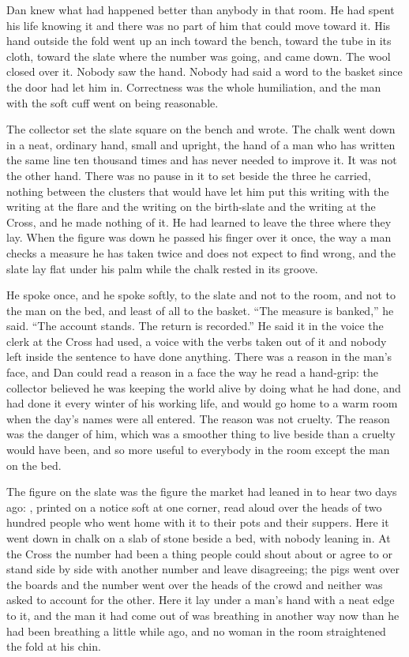 Dan knew what had happened better than anybody in that room. He had spent his life knowing it and there was no part of him that could move toward it. His hand outside the fold went up an inch toward the bench, toward the tube in its cloth, toward the slate where the number was going, and came down. The wool closed over it. Nobody saw the hand. Nobody had said a word to the basket since the door had let him in. Correctness was the whole humiliation, and the man with the soft cuff went on being reasonable.

\scenebreak

The collector set the slate square on the bench and wrote. The chalk went down in a neat, ordinary hand, small and upright, the hand of a man who has written the same line ten thousand times and has never needed to improve it. It was not the other hand. There was no pause in it to set beside the three he carried, nothing between the clusters that would have let him put this writing with the writing at the flare and the writing on the birth-slate and the writing at the Cross, and he made nothing of it. He had learned to leave the three where they lay. When the figure was down he passed his finger over it once, the way a man checks a measure he has taken twice and does not expect to find wrong, and the slate lay flat under his palm while the chalk rested in its groove.

He spoke once, and he spoke softly, to the slate and not to the room, and not to the man on the bed, and least of all to the basket. “The measure is banked,” he said. “The account stands. The return is recorded.” He said it in the voice the clerk at the Cross had used, a voice with the verbs taken out of it and nobody left inside the sentence to have done anything. There was a reason in the man's face, and Dan could read a reason in a face the way he read a hand-grip: the collector believed he was keeping the world alive by doing what he had done, and had done it every winter of his working life, and would go home to a warm room when the day's names were all entered. The reason was not cruelty. The reason was the danger of him, which was a smoother thing to live beside than a cruelty would have been, and so more useful to everybody in the room except the man on the bed.

The figure on the slate was the figure the market had leaned in to hear two days ago: , printed on a notice soft at one corner, read aloud over the heads of two hundred people who went home with it to their pots and their suppers. Here it went down in chalk on a slab of stone beside a bed, with nobody leaning in. At the Cross the number had been a thing people could shout about or agree to or stand side by side with another number and leave disagreeing; the pigs went over the boards and the number went over the heads of the crowd and neither was asked to account for the other. Here it lay under a man's hand with a neat edge to it, and the man it had come out of was breathing in another way now than he had been breathing a little while ago, and no woman in the room straightened the fold at his chin.

